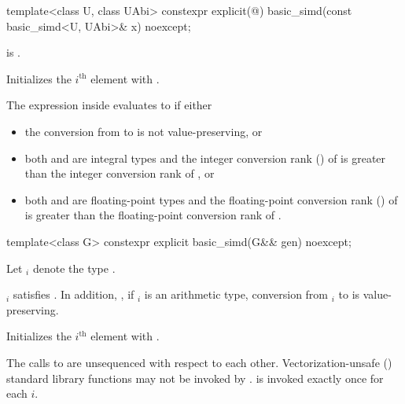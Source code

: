 \begin{itemdecl}
template<class U, class UAbi>
  constexpr explicit(@\seebelow@) basic_simd(const basic_simd<U, UAbi>& x) noexcept;
\end{itemdecl}

\begin{itemdescr}
  \pnum\constraints
   is .

  \pnum\effects
  Initializes the $i^\text{th}$ element with  \foralli.

  \pnum\remarks
  The expression inside  evaluates to  if either
  \begin{itemize}
    \item the conversion from  to  is not
      value-preserving, or

    \item both  and  are integral types and the
      integer conversion rank () of  is greater than
      the integer conversion rank of , or

    \item both  and  are floating-point types and
      the floating-point conversion rank () of  is
      greater than the floating-point conversion rank of .
  \end{itemize}
\end{itemdescr}

\begin{itemdecl}
template<class G> constexpr explicit basic_simd(G&& gen) noexcept;
\end{itemdecl}

\begin{itemdescr}
  \pnum Let $_i$ denote the type
  .

  \pnum\constraints
  $_i$ satisfies  \foralli.
  In addition, \foralli, if $_i$ is an arithmetic type, conversion from
  $_i$ to  is value-preserving.

  \pnum\effects
  Initializes the $i^\text{th}$ element with
   \foralli.

  \pnum\remarks
    The calls to  are unsequenced with respect to each other.
    Vectorization-unsafe () standard library
    functions may not be invoked by .
     is invoked exactly once for each $i$.

   
\end{itemdescr}

